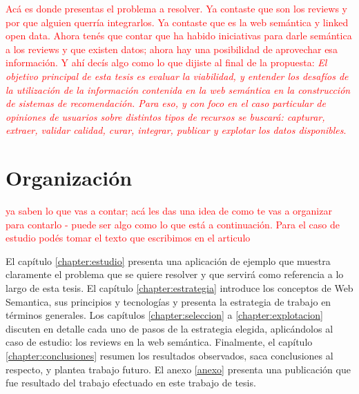\begin{framed}
\textcolor{red}{Acá es donde presentas el problema a resolver. Ya contaste que son los reviews y por que alguien querría integrarlos. Ya contaste que es la web semántica y linked open data. Ahora tenés que contar que ha habido iniciativas para darle semántica a los reviews y que existen datos; ahora hay una posibilidad de aprovechar esa información. Y ahí decís algo como lo que dijiste al final de la propuesta: \textit{El objetivo principal de esta tesis es evaluar la viabilidad, y entender los desafíos de la utilización de la información contenida en la web semántica en la construcción de sistemas de recomendación. Para eso, y con foco en el caso particular de opiniones de usuarios sobre distintos tipos de recursos se buscará: capturar, extraer, validar calidad, curar, integrar, publicar y explotar los datos disponibles}.}
\end{framed}

\section{Organización}
\label{section:organizacion}

\begin{framed}
\textcolor{red}{ya saben lo que vas a contar; acá les das una idea de como te vas a organizar para contarlo - puede ser algo como lo que está a continuación. Para el caso de estudio podés tomar el texto que escribimos en el articulo}
\end{framed}

El capítulo \ref{chapter:estudio} presenta una aplicación de ejemplo que muestra claramente el problema que se quiere resolver y que servirá como referencia a lo largo de esta tesis. El capítulo \ref{chapter:estrategia} introduce los conceptos de Web Semantica, sus principios y tecnologías y presenta la estrategia de trabajo en términos generales. Los capítulos \ref{chapter:seleccion} a \ref{chapter:explotacion} discuten en detalle cada uno de pasos de la estrategia elegida, aplicándolos al caso de estudio: los reviews en la web semántica. Finalmente, el capítulo \ref{chapter:conclusiones} resumen los resultados observados, saca conclusiones al respecto, y plantea trabajo futuro. El anexo \ref{anexo} presenta una publicación que fue resultado del trabajo efectuado en este trabajo de tesis. 





